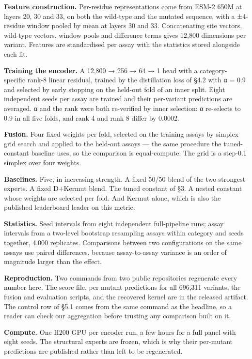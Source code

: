 \documentclass[sigconf,review,nonacm]{acmart}
\begin{document}
\textbf{Feature construction.} Per-residue representations come from ESM-2 650M at layers 20, 30 and 33, on
both the wild-type and the mutated sequence, with a ±4-residue window pooled by mean at layers 30 and
33. Concatenating site vectors, wild-type vectors, window pools and difference terms gives 12,800
dimensions per variant. Features are standardised per assay with the statistics stored alongside each
fit.

\textbf{Training the encoder.} A 12,800 → 256 → 64 → 1 head with a category-specific rank-8 linear residual,
trained by the distillation loss of §4.2 with α = 0.9 and selected by early stopping on the held-out
fold of an inner split. Eight independent seeds per assay are trained and their per-variant predictions
are averaged. α and the rank were both re-verified by inner selection: α re-selects to 0.9 in all five
folds, and rank 4 and rank 8 differ by 0.0002.

\textbf{Fusion.} Four fixed weights per fold, selected on the training assays by simplex grid search and
applied to the held-out assays --- the same procedure the tuned-constant baseline uses, so the comparison
is equal-compute. The grid is a step-0.1 simplex over four weights.

\textbf{Baselines.} Five, in increasing strength. A fixed 50/50 blend of the two strongest experts. A fixed
D+Kermut blend. The tuned constant of §3. A nested constant whose weights are selected per fold. And
Kermut alone, which is also the published leaderboard leader on this metric.

\textbf{Statistics.} Seed intervals from eight independent full-pipeline runs; assay intervals from a
two-level bootstrap resampling assays within category and seeds together, 4,000 replicates. Comparisons
between two configurations on the same assays use paired differences, because assay-to-assay variance is
an order of magnitude larger than the effect.

\textbf{Reproduction.} Two commands from two public repositories regenerate every number here. The score
file, per-mutant predictions for all 696,311 variants, the fusion and evaluation scripts, and the
recovered kernel are in the released artifact. The control row of §5.1 comes from the same command as
the headline, so a reader can check our aggregation before trusting any comparison built on it.

\textbf{Compute.} One H200 GPU per encoder run, a few hours for a full panel with eight seeds. The structural
experts are frozen, which is why their per-mutant predictions are published rather than left to be
regenerated.
\end{document}
